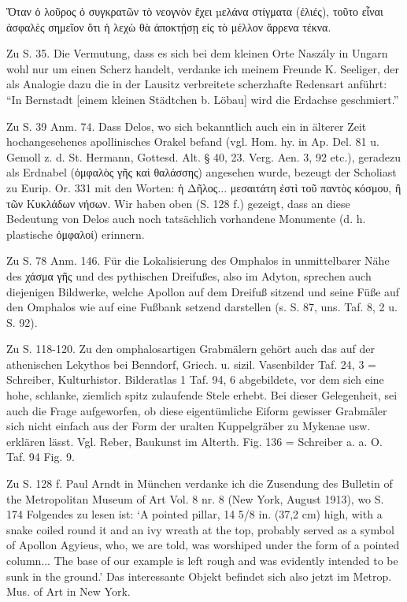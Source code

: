 \documentclass[a4paper, 11pt, oneside]{article}
\begin{document}
Ὅταν ὁ λοῦρος ὁ συγκρατῶν τὸ νεογνὸν ἔχει µελάνα στίγματα (ἐλιές), τοῦτο εἶναι ἀσφαλὲς σημεῖον ὅτι ἡ λεχὼ θὰ ἀποκτῄσῃ εἰς τὸ μέλλον ἄρρενα τέκνα.

Zu S. 35. Die Vermutung, dass es sich bei dem kleinen Orte Naszály in Ungarn wohl nur um einen Scherz handelt, verdanke ich meinem Freunde K. Seeliger, der als Analogie dazu die in der Lausitz verbreitete scherzhafte Redensart anführt: "`In Bernstadt [einem kleinen Städtchen b. Löbau] wird die Erdachse geschmiert."'

Zu S. 39 Anm. 74. Dass Delos, wo sich bekanntlich auch ein in älterer Zeit hochangesehenes apollinisches Orakel befand (vgl. Hom. hy. in Ap. Del. 81 u. Gemoll z. d. St. Hermann, Gottesd. Alt. § 40, 23. Verg. Aen. 3, 92 etc.), geradezu als Erdnabel (ὀμφαλὸς γῆς καὶ θαλάσσης) angesehen wurde, bezeugt der Scholiast zu Eurip. Or. 331 mit den Worten: ἡ Δῆλος... μεσαιτάτη ἐστὶ τοῦ παντὸς κόσμου, ἢ τῶν Κυκλάδων νήσων. Wir haben oben (S. 128 f.) gezeigt, dass an diese Bedeutung von Delos auch noch tatsächlich vorhandene Monumente (d. h. plastische ὀμφαλοί) erinnern.

Zu S. 78 Anm. 146. Für die Lokalisierung des Omphalos in unmittelbarer Nähe des χάσμα γῆς und des pythischen Dreifußes, also im Adyton, sprechen auch diejenigen Bildwerke, welche Apollon auf dem Dreifuß sitzend und seine Füße auf den Omphalos wie auf eine Fußbank setzend darstellen (s. S. 87, uns. Taf. 8, 2 u. S. 92).

Zu S. 118-120. Zu den omphalosartigen Grabmälern gehört auch das auf der athenischen Lekythos bei Benndorf, Griech. u. sizil. Vasenbilder Taf. 24, 3 = Schreiber, Kulturhistor. Bilderatlas 1 Taf. 94, 6 abgebildete, vor dem sich eine hohe, schlanke, ziemlich spitz zulaufende Stele erhebt. Bei dieser Gelegenheit, sei auch die Frage aufgeworfen, ob diese eigentümliche Eiform gewisser Grabmäler sich nicht einfach aus der Form der uralten Kuppelgräber zu Mykenae usw. erklären lässt. Vgl. Reber, Baukunst im Alterth. Fig. 136 = Schreiber a. a. O. Taf. 94 Fig. 9.

Zu S. 128 f. Paul Arndt in München verdanke ich die Zusendung des Bulletin of the Metropolitan Museum of Art Vol. 8 nr. 8 (New York, August 1913), wo S. 174 Folgendes zu lesen ist: `A pointed pillar, 14 5/8 in. (37,2 cm) high, with a snake coiled round it and an ivy wreath at the top, probably served as a symbol of Apollon Agyieus, who, we are told, was worshiped under the form of a pointed column... The base of our example is left rough and was evidently intended to be sunk in the ground.' Das interessante Objekt befindet sich also jetzt im Metrop. Mus. of Art in New York.
\clearpage
\end{document}
